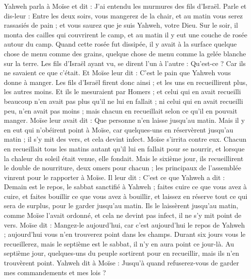 \begin{multicols}{2}
Yahweh parla à Moïse et dit :
J'ai entendu les murmures des fils d'Israël. Parle et dis-leur : Entre les deux soirs, vous mangerez de la chair, et au matin vous serez rassasiés de pain ; et vous saurez que je suis Yahweh, votre Dieu.
Sur le soir, il monta des cailles qui couvrirent le camp, et au matin il y eut une couche de rosée autour du camp.
Quand cette rosée fut dissipée, il y avait à la surface quelque chose de menu comme des grains, quelque chose de menu comme la gelée blanche sur la terre.
Les fils d'Israël ayant vu, se dirent l'un à l'autre : Qu'est-ce ? Car ils ne savaient ce que c'était. Et Moïse leur dit : C'est le pain que Yahweh vous donne à manger\FTNT{}.
Les fils d'Israël firent donc ainsi ; et les uns en recueillirent plus, les autres moins.
Et ils le mesuraient par Homers ; et celui qui en avait recueilli beaucoup n'en avait pas plus qu'il ne lui en fallait ; ni celui qui en avait recueilli peu, n'en avait pas moins ; mais chacun en recueillait selon ce qu'il en pouvait manger.
Moïse leur avait dit : Que personne n'en laisse jusqu’au matin.
Mais il y en eut qui n'obéirent point à Moïse, car quelques-uns en réservèrent jusqu'au matin ; il s'y mit des vers, et cela devint infect. Moïse s’irrita contre eux.
Chacun en recueillait tous les matins autant qu'il lui en fallait pour se nourrir, et lorsque la chaleur du soleil était venue, elle fondait.
Mais le sixième jour, ils recueillirent le double de nourriture, deux omers pour chacun ; les principaux de l'assemblée vinrent pour le rapporter à Moïse.
Il leur dit : C'est ce que Yahweh a dit : Demain est le repos, le sabbat sanctifié à Yahweh ; faites cuire ce que vous avez à cuire, et faites bouillir ce que vous avez à bouillir, et laissez en réserve tout ce qui sera de surplus, pour le garder jusqu'au matin.
Ils le laissèrent jusqu’au matin, comme Moïse l'avait ordonné, et cela ne devint pas infect, il ne s’y mit point de vers.
Moïse dit : Mangez-le aujourd'hui, car c'est aujourd'hui le repos de Yahweh ; aujourd'hui vous n'en trouverez point dans les champs.
Durant six jours vous le recueillerez, mais le septième est le sabbat, il n'y en aura point ce jour-là.
Au septième jour, quelques-uns du peuple sortirent pour en recueillir, mais ils n'en trouvèrent point.
Yahweh dit à Moïse : Jusqu’à quand refuserez-vous de garder mes commandements et mes lois ?

\end{multicols}
